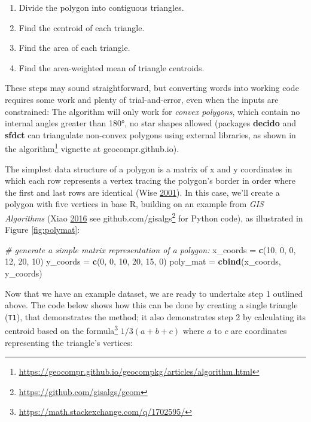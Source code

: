 \documentclass[]{krantz}
\newenvironment{Shaded}{\begin{snugshade}}{\end{snugshade}}
\newcommand{\CommentTok}[1]{\textcolor[rgb]{0.37,0.37,0.37}{\textit{#1}}}
\newcommand{\DecValTok}[1]{\textcolor[rgb]{0.06,0.06,0.06}{#1}}
\newcommand{\KeywordTok}[1]{\textcolor[rgb]{0.27,0.27,0.27}{\textbf{#1}}}
\newcommand{\NormalTok}[1]{#1}
\newcommand{\StringTok}[1]{\textcolor[rgb]{0.5,0.5,0.5}{#1}}
\providecommand{\tightlist}{%
  \setlength{\itemsep}{0pt}\setlength{\parskip}{0pt}}
\let\rmarkdownfootnote\footnote%
\def\footnote{\protect\rmarkdownfootnote}
\renewcommand{\href}[2]{#2\footnote{\url{#1}}}
\begin{document}
\begin{enumerate}
\def\labelenumi{\arabic{enumi}.}
\tightlist
\item
  Divide the polygon into contiguous triangles.
\item
  Find the centroid of each triangle.
\item
  Find the area of each triangle.
\item
  Find the area-weighted mean of triangle centroids.
\end{enumerate}

These steps may sound straightforward, but converting words into working code requires some work and plenty of trial-and-error, even when the inputs are constrained:
The algorithm will only work for \emph{convex polygons}, which contain no internal angles greater than 180°, no star shapes allowed (packages \textbf{decido} and \textbf{sfdct} can triangulate non-convex polygons using external libraries, as shown in the \href{https://geocompr.github.io/geocompkg/articles/algorithm.html}{algorithm} vignette at geocompr.github.io).

The simplest data structure of a polygon is a matrix of x and y coordinates in which each row represents a vertex tracing the polygon's border in order where the first and last rows are identical (Wise \protect\hyperlink{ref-wise_gis_2001}{2001}).
In this case, we'll create a polygon with five vertices in base R, building on an example from \emph{GIS Algorithms} (Xiao \protect\hyperlink{ref-xiao_gis_2016}{2016} see \href{https://github.com/gisalgs/geom}{github.com/gisalgs} for Python code), as illustrated in Figure \ref{fig:polymat}:

\begin{Shaded}
\begin{Highlighting}[]
\CommentTok{# generate a simple matrix representation of a polygon:}
\NormalTok{x_coords =}\StringTok{ }\KeywordTok{c}\NormalTok{(}\DecValTok{10}\NormalTok{, }\DecValTok{0}\NormalTok{, }\DecValTok{0}\NormalTok{, }\DecValTok{12}\NormalTok{, }\DecValTok{20}\NormalTok{, }\DecValTok{10}\NormalTok{)}
\NormalTok{y_coords =}\StringTok{ }\KeywordTok{c}\NormalTok{(}\DecValTok{0}\NormalTok{, }\DecValTok{0}\NormalTok{, }\DecValTok{10}\NormalTok{, }\DecValTok{20}\NormalTok{, }\DecValTok{15}\NormalTok{, }\DecValTok{0}\NormalTok{)}
\NormalTok{poly_mat =}\StringTok{ }\KeywordTok{cbind}\NormalTok{(x_coords, y_coords)}
\end{Highlighting}
\end{Shaded}

Now that we have an example dataset, we are ready to undertake step 1 outlined above.
The code below shows how this can be done by creating a single triangle (\texttt{T1}), that demonstrates the method; it also demonstrates step 2 by calculating its centroid based on the \href{https://math.stackexchange.com/q/1702595/}{formula} \(1/3(a + b + c)\) where \(a\) to \(c\) are coordinates representing the triangle's vertices:
\end{document}
